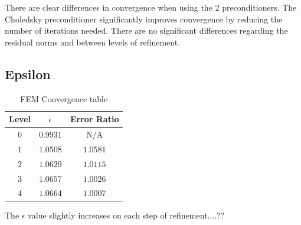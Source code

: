 \documentclass[a4paper, 11pt]{article}
\begin{document}
				There are clear differences in convergence when using the 2 preconditioners.
				The Choledsky preconditioner significantly improves convergence by reducing the number of iterations needed.
				There are no significant differences regarding the residual norms and between levels of refinement.
			
			\subsection{Epsilon}
				\begin{table}[H]
					\centering
					\begin{tabular}{c|c|c}
						\textbf{Level} 	& \textbf{$ \epsilon $} & \textbf{ Error Ratio}  \\ \hline
						$ 0  $			& $ 0.9931 $ 			& N/A \\ \hline
						$ 1  $			& $ 1.0508 $ 			& $ 1.0581 $ \\ \hline
						$ 2  $			& $ 1.0629 $ 			& $ 1.0115 $ \\ \hline
						$ 3  $			& $ 1.0657 $	 		& $ 1.0026 $ \\ \hline
						$ 4  $			& $ 1.0664 $ 			& $ 1.0007 $ \\ 
					\end{tabular}
					\caption{FEM Convergence table}
					\label{table:errors}
				\end{table}
				The $ \epsilon $ value slightly increases on each step of refinement....??
	
	
\end{document}
